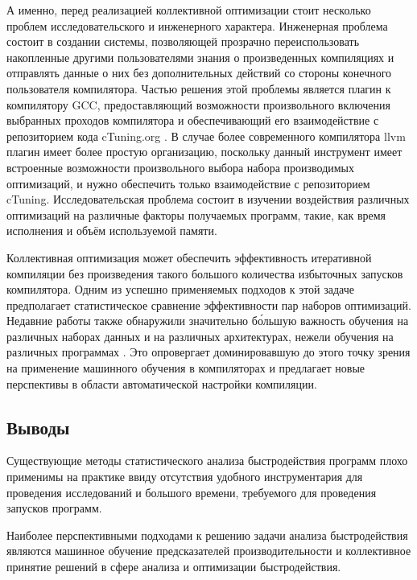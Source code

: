 А именно, перед реализацией коллективной оптимизации стоит несколько проблем исследовательского и инженерного характера. Инженерная проблема состоит в создании системы, позволяющей прозрачно переиспользовать накопленные другими пользователями знания о произведенных компиляциях и отправлять данные о них без дополнительных действий со стороны конечного пользователя компилятора. Частью решения этой проблемы является плагин к компилятору GCC, предоставляющий возможности произвольного включения выбранных проходов компилятора и обеспечивающий его взаимодействие с репозиторием кода cTuning.org \cite{Fur2009}. В случае более современного компилятора llvm \cite{llvm} плагин имеет более простую организацию, поскольку данный инструмент имеет встроенные возможности произвольного выбора набора производимых оптимизаций, и нужно обеспечить только взаимодействие с репозиторием cTuning. Исследовательская проблема состоит в изучении воздействия различных оптимизаций на различные факторы получаемых программ, такие, как время исполнения и объём используемой памяти.

Коллективная оптимизация может обеспечить эффективность итеративной компиляции без произведения такого большого количества избыточных запусков компилятора. Одним из успешно применяемых подходов к этой задаче предполагает статистическое сравнение эффективности пар наборов оптимизаций. Недавние работы также обнаружили значительно б\'{о}льшую важность обучения на различных наборах данных и на различных архитектурах, нежели обучения на различных программах \cite{springerlink:10.1007/11596110:24}. Это опровергает доминировавшую до этого точку зрения на применение машинного обучения в компиляторах и предлагает новые перспективы в области автоматической настройки компиляции.


\subsection{Выводы}
Существующие методы статистического анализа быстродействия программ плохо применимы на практике ввиду отсутствия удобного инструментария для проведения исследований и большого времени, требуемого для проведения запусков программ.

Наиболее перспективными подходами к решению задачи анализа быстродействия являются машинное обучение предсказателей производительности и коллективное принятие решений в сфере анализа и оптимизации быстродействия.